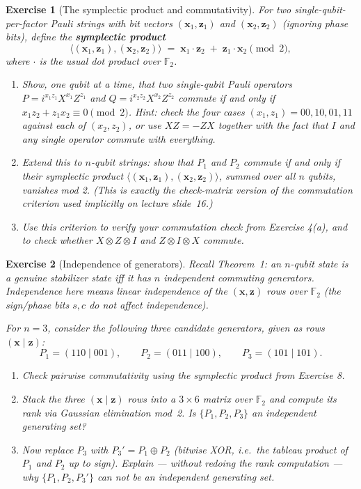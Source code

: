\documentclass[11pt]{article}
\newtheorem*{exercise}{Exercise}
\newcommand{\F}{\mathbb{F}_2}
\begin{document}
\begin{exercise}[The symplectic product and commutativity]
For two single-qubit-per-factor Pauli strings with bit vectors
$(\mathbf x_1,\mathbf z_1)$ and $(\mathbf x_2,\mathbf z_2)$ (ignoring phase
bits), define the \textbf{symplectic product}
\[
    \langle (\mathbf x_1,\mathbf z_1), (\mathbf x_2,\mathbf z_2)\rangle
    \;=\; \mathbf x_1 \cdot \mathbf z_2 \;+\; \mathbf z_1 \cdot \mathbf x_2
    \pmod 2,
\]
where $\cdot$ is the usual dot product over $\F$.
\begin{enumerate}[label=(\alph*)]
    \item Show, one qubit at a time, that two single-qubit Pauli operators
    $P = i^{x_1z_1}X^{x_1}Z^{z_1}$ and $Q = i^{x_2z_2}X^{x_2}Z^{z_2}$
    commute if and only if $x_1z_2 + z_1x_2 \equiv 0 \pmod 2$.
    \emph{Hint:} check the four cases $(x_1,z_1) = 00,10,01,11$ against
    each of $(x_2,z_2)$, or use $XZ=-ZX$ together with the fact that $I$
    and any single operator commute with everything.
    \item Extend this to $n$-qubit strings: show that $P_1$ and $P_2$
    commute if and only if their symplectic product $\langle
    (\mathbf x_1,\mathbf z_1),(\mathbf x_2,\mathbf z_2)\rangle$, summed over
    all $n$ qubits, vanishes mod 2. (This is exactly the check-matrix
    version of the commutation criterion used implicitly on lecture
    slide~16.)
    \item Use this criterion to verify your commutation check from
    Exercise 4(a), and to check whether $X\otimes Z \otimes I$ and $Z
    \otimes I \otimes X$ commute.
\end{enumerate}
\end{exercise}

\begin{exercise}[Independence of generators]
Recall Theorem~1: an $n$-qubit state is a genuine stabilizer state
\emph{iff} it has $n$ \emph{independent} commuting generators. Independence
here means linear independence of the $(\mathbf x,\mathbf z)$ rows over
$\F$ (the sign/phase bits $s,c$ do not affect independence).

\noindent
For $n=3$, consider the following three candidate generators, given as
rows $(\mathbf x \mid \mathbf z)$:
\[
    P_1 = (110\mid 001), \qquad
    P_2 = (011\mid 100), \qquad
    P_3 = (101\mid 101).
\]
\begin{enumerate}[label=(\alph*)]
    \item Check pairwise commutativity using the symplectic product from
    Exercise 8.
    \item Stack the three $(\mathbf x\mid\mathbf z)$ rows into a $3\times 6$
    matrix over $\F$ and compute its rank via Gaussian elimination mod~2.
    Is $\{P_1,P_2,P_3\}$ an independent generating set?
    \item Now replace $P_3$ with $P_3' = P_1 \oplus P_2$ (bitwise XOR, i.e.\
    the tableau product of $P_1$ and $P_2$ up to sign). Explain --- without
    redoing the rank computation --- why $\{P_1,P_2,P_3'\}$ can \emph{not}
    be an independent generating set.
\end{enumerate}
\end{exercise}
\end{document}
